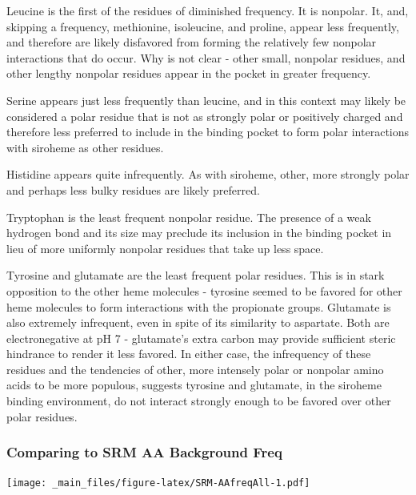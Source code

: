 \documentclass[a4paper, nobind]{templates/ociamthesis}
\let\origfigure\figure
\let\endorigfigure\endfigure
\renewenvironment{figure}[1][2] {
    \expandafter\origfigure\expandafter[H]
} {
    \endorigfigure
}
\begin{document}
Leucine is the first of the residues of diminished frequency. It is nonpolar. It, and, skipping a frequency, methionine, isoleucine, and proline, appear less frequently, and therefore are likely disfavored from forming the relatively few nonpolar interactions that do occur. Why is not clear - other small, nonpolar residues, and other lengthy nonpolar residues appear in the pocket in greater frequency.

Serine appears just less frequently than leucine, and in this context may likely be considered a polar residue that is not as strongly polar or positively charged and therefore less preferred to include in the binding pocket to form polar interactions with siroheme as other residues.

Histidine appears quite infrequently. As with siroheme, other, more strongly polar and perhaps less bulky residues are likely preferred.

Tryptophan is the least frequent nonpolar residue. The presence of a weak hydrogen bond and its size may preclude its inclusion in the binding pocket in lieu of more uniformly nonpolar residues that take up less space.

Tyrosine and glutamate are the least frequent polar residues. This is in stark opposition to the other heme molecules - tyrosine seemed to be favored for other heme molecules to form interactions with the propionate groups. Glutamate is also extremely infrequent, even in spite of its similarity to aspartate. Both are electronegative at pH 7 - glutamate's extra carbon may provide sufficient steric hindrance to render it less favored. In either case, the infrequency of these residues and the tendencies of other, more intensely polar or nonpolar amino acids to be more populous, suggests tyrosine and glutamate, in the siroheme binding environment, do not interact strongly enough to be favored over other polar residues.

\hypertarget{comparing-to-srm-aa-background-freq}{%
\subsubsection{Comparing to SRM AA Background Freq}\label{comparing-to-srm-aa-background-freq}}

\begin{figure}
\centering
\texttt{[image: \_main\_files/figure-latex/SRM-AAfreqAll-1.pdf]}
\caption{\label{fig:SRM-AAfreqAll}SRM: AA Frequency of Monomer}
\end{figure}
\end{document}
